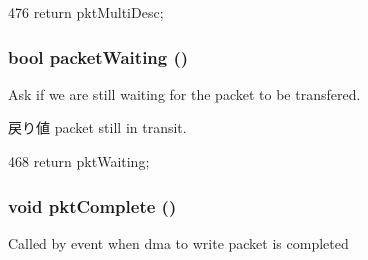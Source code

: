 \begin{DoxyCode}
476 { return pktMultiDesc;}
\end{DoxyCode}
\hypertarget{classIGbE_1_1TxDescCache_ad8a4f7d1ef74ba318f35597c58bc757b}{
\subsubsection[{packetWaiting}]{\setlength{\rightskip}{0pt plus 5cm}bool packetWaiting ()}}
\label{classIGbE_1_1TxDescCache_ad8a4f7d1ef74ba318f35597c58bc757b}
Ask if we are still waiting for the packet to be transfered. \begin{DoxyReturn}{戻り値}
packet still in transit. 
\end{DoxyReturn}



\begin{DoxyCode}
468 { return pktWaiting; }
\end{DoxyCode}
\hypertarget{classIGbE_1_1TxDescCache_a4f0881be8aa8698e16dcf52a89085100}{
\subsubsection[{pktComplete}]{\setlength{\rightskip}{0pt plus 5cm}void pktComplete ()}}
\label{classIGbE_1_1TxDescCache_a4f0881be8aa8698e16dcf52a89085100}
Called by event when dma to write packet is completed 


